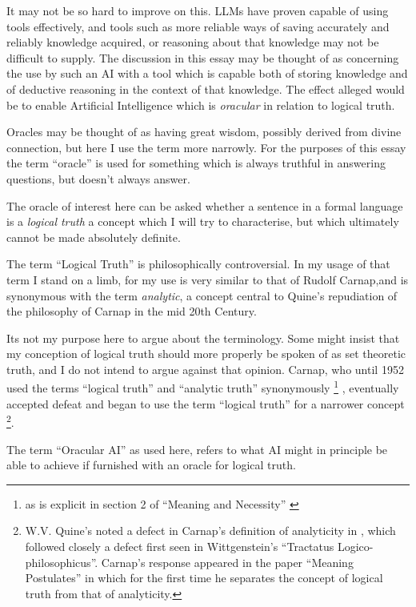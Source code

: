 \documentclass[10pt,titlepage]{book}
\begin{document}
It may not be so hard to improve on this.
LLMs have proven capable of using tools effectively, and tools such as more reliable ways of saving accurately and reliably knowledge acquired, or reasoning about that knowledge may not be difficult to supply.
The discussion in this essay may be thought of as concerning the use by such an AI with a tool which is capable both of storing knowledge and of deductive reasoning in the context of that knowledge.
The effect alleged would be to enable Artificial Intelligence which is \emph{oracular} in relation to logical truth.

Oracles may be thought of as having great wisdom, possibly derived from divine connection, but here I use the term more narrowly.
For the purposes of this essay the term ``oracle'' is used for something which is always truthful in answering questions, but doesn't always answer.

The oracle of interest here can be asked whether a sentence in a formal language is a \emph{logical truth} a concept which I will try to characterise, but which ultimately cannot be made absolutely definite.

The term ``Logical Truth'' is philosophically controversial.
In my usage of that term I stand on a limb, for my use is very similar to that of Rudolf Carnap,and is synonymous with the term \emph{analytic}, a concept central to Quine's repudiation of the philosophy of Carnap in the mid 20th Century.

Its not my purpose here to argue about the terminology.
Some might insist that my conception of logical truth should more properly be spoken of as set theoretic truth, and I do not intend to argue against that opinion.
Carnap, who until 1952 used the terms ``logical truth'' and ``analytic truth'' synonymously %
\footnote{as is explicit in section 2 of ``Meaning and Necessity'' \cite{carnap56}}%
, eventually accepted defeat and began to use the term ``logical truth'' for a narrower concept%
\footnote{W.V. Quine's noted a defect in Carnap's definition of analyticity in \cite{carnap56}, which followed closely a defect first seen in Wittgenstein's ``Tractatus Logico-philosophicus''\cite{Wittgenstein1921}.
Carnap's response appeared in the paper ``Meaning Postulates''\cite{carnap52} in which for the first time he separates the concept of logical truth from that of analyticity.}.

The term ``Oracular AI'' as used here, refers to what AI might in principle be able to achieve if furnished with an oracle for logical truth.
\end{document}
